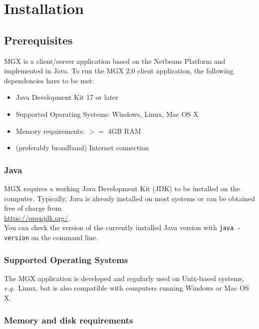 
\chapter{Installation}
\label{installation}

\section{Prerequisites}

MGX is a client/server application based on the Netbeans Platform and implemented
in Java. To run the MGX 2.0 client application, the following dependencies have to be
met:

\begin{itemize}
  \item{Java Development Kit 17 or later}
  \item{Supported Operating Systems: Windows, Linux, Mac OS X}
  \item{Memory requirements: $>=$ 4GB RAM}
  \item{(preferably broadband) Internet connection}
\end{itemize}

\subsection{Java}

MGX requires a working Java Development Kit (JDK) to be installed on the computer. Typically,
Java is already installed on most systems or can be obtained free of charge from\\

\url{https://openjdk.org/}.\\

You can check the version of the currently installed Java version with
\texttt{java -version} on the command line.

\subsection{Supported Operating Systems}

The MGX application is developed and regularly used on Unix-based systems, \textit{e.g.}~Linux,
but is also compatible with computers running Windows or Mac OS X.

\subsection{Memory and disk requirements}

